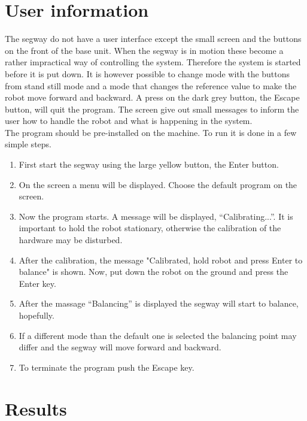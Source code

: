 \documentclass[a4paper]{article}
\begin{document}
\section{User information}

The segway do not have a user interface except the small screen and the buttons on the front of the base unit. When the segway is in motion these become a rather impractical way of controlling the system. Therefore the system is started before it is put down. It is however possible to change mode with the buttons from stand still mode and a mode that changes the reference value to make the robot move forward and backward. A press on the dark grey button, the Escape button, will quit the program. The screen give out small messages to inform the user how to handle the robot and what is happening in the system.\\

The program should be pre-installed on the machine. To run it is done in a few simple steps.

\begin{enumerate}
\item First start the segway using the large yellow button, the Enter button.
\item On the screen a menu will be displayed. Choose the default program on the screen.
\item Now the program starts. A message will be displayed, “Calibrating...”. It is important to hold the robot stationary, otherwise the calibration of the hardware may be disturbed.
\item After the calibration, the message "Calibrated, hold robot and press Enter to balance" is shown. Now, put down the robot on the ground and press the Enter key.
\item After the massage “Balancing” is displayed the segway will start to balance, hopefully.
\item If a different mode than the default one is selected the balancing point may differ and the segway will move forward and backward.
\item To terminate the program push the Escape key.
\end{enumerate}

\section{Results}
\end{document}
